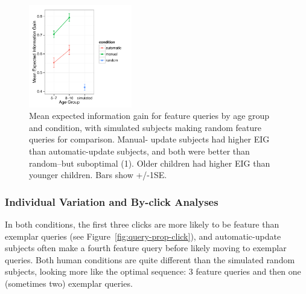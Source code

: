 \documentclass[10pt,letterpaper]{article}
\begin{document}
\begin{figure}[t]
  \centering
  \includegraphics[width=0.4\textwidth]{figures/EIG_by_ageGroup_n_condition}
  \caption{Mean expected information gain for feature queries by age group and condition, 
with simulated subjects making random feature queries for comparison. Manual-
update subjects had higher EIG than automatic-update subjects, and both were 
better than random--but suboptimal (1). Older children had higher EIG than younger children. Bars show +/-1SE.}
  \label{fig:EIG_by_age}
\end{figure} 



\subsubsection{Individual Variation and By-click Analyses}



In both conditions, the first three clicks are more likely to be feature than exemplar 
queries (see Figure~\ref{fig:query-prop-click}), and automatic-update subjects often 
make a fourth feature query before likely moving to exemplar queries. Both human 
conditions are quite different than the simulated random subjects, looking more like 
the optimal sequence: 3 feature queries and then one (sometimes two) exemplar 
queries. 
\end{document}
